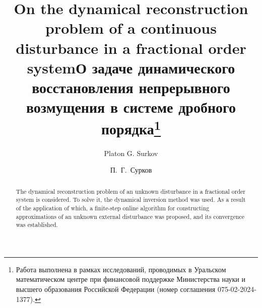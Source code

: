 \begin{englishtitle} %
\title{On the dynamical reconstruction problem  of a continuous disturbance in a fractional order system}
\author{Platon G. Surkov
}

\maketitle

\begin{abstract}
The dynamical reconstruction problem of  an unknown disturbance in a fractional order system is considered.
To solve it, the dynamical inversion method was used.
As a result of the application of which, a finite-step online algorithm for constructing approximations of an unknown external disturbance was proposed, and its convergence was established.

\end{abstract}
\end{englishtitle}

\iffalse
\documentclass[12pt]{llncs}  


\usepackage{iftex}

\ifPDFTeX
\usepackage[T2A]{fontenc}
\usepackage[utf8]{inputenc} %
\usepackage[english,russian]{babel}
\fi

\usepackage{todonotes} 

\usepackage[russian]{nla}


\fi

\title{О задаче динамического восстановления непрерывного возмущения в системе дробного порядка\thanks{Работа выполнена в рамках исследований, проводимых в Уральском математическом центре при финансовой поддержке Министерства науки и высшего образования Российской Федерации (номер соглашения 075-02-2024-1377).}}
\author{П.~Г.~Сурков  %
} %

